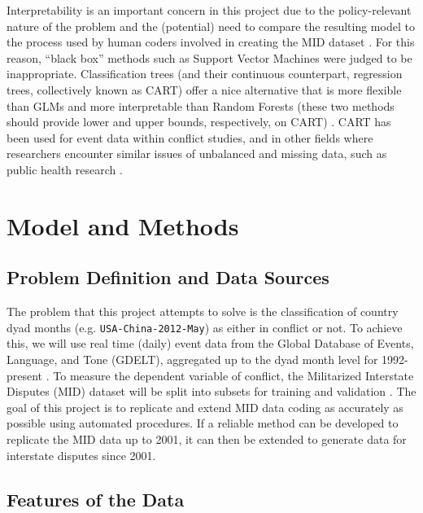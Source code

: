 \documentclass[12pt,letterpaper]{article} %
\begin{document}

Interpretability is an important concern in this project due to the policy-relevant nature of the problem and the (potential) need to compare the resulting model to the process used by human coders involved in creating the MID dataset \citep{ghosn2004mid3}. For this reason, ``black box'' methods such as Support Vector Machines were judged to be inappropriate. Classification trees (and their continuous counterpart, regression trees, collectively known as CART) offer a nice alternative that is more flexible than GLMs and more interpretable than Random Forests (these two methods should provide lower and upper bounds, respectively, on CART) \citep{klebanov2008lexical}. CART has been used for event data within conflict studies, and in other fields where researchers encounter similar issues of unbalanced and missing data, such as public health research \citep{schrodt1990predicting,speybroeck2012classification,trappl1996digging}.

\section{Model and Methods}

\subsection{Problem Definition and Data Sources}

The problem that this project attempts to solve is the classification of country dyad months (e.g. \texttt{USA-China-2012-May}) as either in conflict or not. To achieve this, we will use real time (daily) event data from the Global Database of Events, Language, and Tone (GDELT), aggregated up to the dyad month level for 1992-present \citep{schrodt2013gdelt}. To measure the dependent variable of conflict, the Militarized Interstate Disputes (MID) dataset will be split into subsets for training and validation \citep{ghosn2004mid3}. The goal of this project is to replicate and extend MID data coding as accurately as possible using automated procedures. If a reliable method can be developed to replicate the MID data up to 2001, it can then be extended to generate data for interstate disputes since 2001. 


\subsection{Features of the Data}
\end{document}
